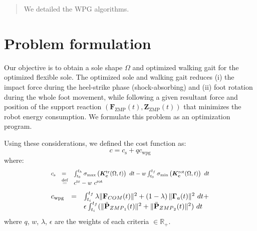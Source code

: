\documentclass[journal]{IEEEtran}
\begin{document}
\maketitle
\begin{abstract}
We detailed the WPG algorithms.
\end{abstract}



\section{Problem formulation}
\label{sec:problem_form}
Our objective is to obtain a sole shape $\Omega$ and optimized walking gait for the optimized flexible sole. The optimized sole and walking gait reduces (i) the impact force during the heel-strike phase (shock-absorbing) and (ii) foot rotation during the whole foot movement, while following a given resultant force and position of the support reaction $(\boldsymbol{F}_{\text{ZMP}}(t), \boldsymbol{Z}_{\text{ZMP}}(t))$ that minimizes the robot energy consumption. We formulate this problem as an optimization program.

Using these considerations, we defined the cost function as:
\begin{equation}
c = c_{\text{s}} + q c_{\text{wpg}}
\label{eq:optim_tot}
\end{equation}
where:
\begin{equation}
\scalebox{0.85}{$
\begin{array}{lll}
c_{\text{s}} &=& \int_{t_0}^{t_{h}} \sigma_{\max}\left(\boldsymbol{K^{\text{tr}}_{c}}(\Omega,t)\right) \ dt - w \int_{t_0}^{t_f} \sigma_{\min}\left(\boldsymbol{K^{\text{rot}}_{c}}(\Omega,t)\right) \ \mbox{dt}\\
&\overset{\text{def}}{=}& c^{\text{tr}} - w \ c^{\text{rot}}
\end{array}
$}
\label{eq:optim_criterion_sole}
\end{equation}
\begin{equation}
\begin{array}{lll}
c_{\text{wpg}} &=& \int_{t_{i}}^{t_{f}} \lambda \Vert\mathbf{F}_{\mbox{\tiny COM}}(t)\Vert^{2}+ \left(1-\lambda\right) \Vert\mathbf{\Gamma}_{a}(t)\Vert^{2} \ \mbox{dt} + \\
&&\epsilon \int_{t_{i}}^{t_{f}} ( \Vert\ddot{\textbf{P}}_{\mbox{\tiny ZMP}_1}(t)\Vert^{2} + \Vert\ddot{\textbf{P}}_{\mbox{\tiny ZMP}_2}(t)\Vert^{2}) \ \mbox{dt}
\end{array}
\label{eq:optim_criterion_wpg}
\end{equation}
where $q$, $w$, $\lambda$, $\epsilon$ are the weights of each criteria $\in \mathbb{R}_+$.
\end{document}
